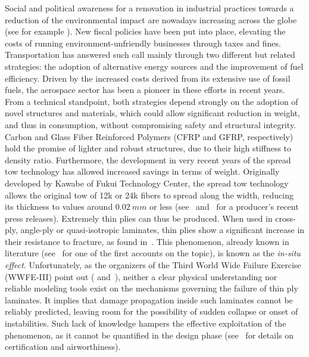 \documentclass
[
a4paper,                      %
twoside,					  %
12pt,                         %
abstract,		      %
fleqn,                        %
]
{scrartcl} %
\begin{document}
Social and political awareness for a renovation in industrial practices towards a reduction of the environmental impact are nowadays increasing across the globe (see for example \cite{Ozik2006}). New fiscal policies have been put into place, elevating the costs of running environment-unfriendly businesses through taxes and fines. Transportation has answered such call mainly through two different but related strategies: the adoption of alternative energy sources and the improvement of fuel efficiency. Driven by the increased costs derived from its extensive use of fossil fuels, the aerospace sector has been a pioneer in these efforts in recent years. From a technical standpoint, both strategies depend strongly on the adoption of novel structures and materials, which could allow significant reduction in weight, and thus in consumption, without compromising safety and structural integrity.\\
Carbon  and Glass Fiber Reinforced Polymers (CFRP and GFRP, respectively) hold the promise of lighter and robust structures, due to their high stiffness to density ratio. Furthermore, the development in very recent years of the spread tow technology has allowed increased savings in terms of weight. Originally developed by Kawabe of Fukui Technology Center, the spread tow technology allows the original tow of 12k or 24k fibers to spread along the width, reducing its thickness to values around $0.02\ mm$ or less (see~\cite{NTPTApril2015} and~\cite{NTPTJune2015} for a producer's recent press releases). Extremely thin plies can thus be produced. When used in cross-ply, angle-ply or quasi-isotropic laminates, thin plies show a significant increase in their resistance to fracture, as found in~\cite{RAmacherJCugnoniJBotsisSeptember2014}. This phenomenon, already known in literature (see~\cite{AParviziJEBaileyOctober1978} for one of the first accounts on the topic), is known as the \textit{in-situ effect}. Unfortunately, as the organizers of the Third World Wide Failure Exercise (WWFE-III) point out (\cite{Kaddour2007} and~\cite{Kaddour2011}), neither a clear physical understanding nor reliable modeling tools exist on the mechanisms governing the failure of thin ply laminates. It implies that damage propagation inside such laminates cannot be reliably predicted, leaving room for the possibility of sudden collapse or onset of instabilities. Such lack of knowledge hampers the effective exploitation of the phenomenon, as it cannot be quantified in the design phase (see~\cite{Minter2011} for details on certification and airworthiness).\\
\end{document}
